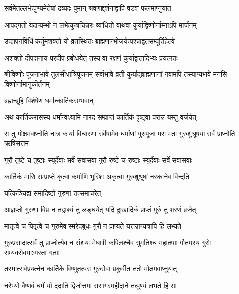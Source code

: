 \twolineshloka
{सर्वमेतल्लभेत्पुण्यमेतेषां द्रव्यदः पुमान्}
{श्रवणाद्दर्शनाद्वापि षडंशं फलमाप्नुयात्} %

\twolineshloka
{आपद्गतो यदाप्यम्भो न लभेत्कुत्रचिन्नरः}
{व्याधितो वाथवा कुर्याद्विष्णोर्नाम्नाऽपि मार्जनम्} %

\twolineshloka
{उद्यापनविधिं कर्तुमशक्तो यो व्रतस्थितः}
{ब्राह्मणान्भोजयेत्पश्चाद्व्रतसम्पूर्तिहेतवे} %

\twolineshloka
{अशक्तो दीपदानाय परदीपं प्रबोधयेत्}
{तस्य वा रक्षणं कुर्याद्वातादिभ्यः प्रयत्नतः} %

\threelineshloka
{श्रीविष्णोः पूजनाभावे तुलसीधात्रिपूजनम्}
{सर्वाभावे व्रती कुर्याद्ब्राह्मणानां गवामपि}
{तस्याप्यभावे मनसि विष्णोर्नामानुकीर्तनम्} %



\onelineshloka
{ब्रह्मन्ब्रूहि विशेषेण धर्मान्कार्तिकसम्भवान्} %





\twolineshloka
{अथ कार्तिकमासस्य धर्मान्वक्ष्यामि नारद}
{सम्प्राप्तं कार्तिकं दृष्ट्वा परान्नं यस्तु वर्जयेत्} %

\threelineshloka
{स तु मोक्षमवाप्नोति नात्र कार्या विचारणा}
{सर्वेषामेव धर्माणां गुरुपूजा परा मता}
{गुरुशुश्रूषया सर्वं प्राप्नोति ऋषिसत्तम} %

\twolineshloka
{गुरौ तुष्टे च तुष्टाः स्युर्देवाः सर्वे सवासवा}
{गुरौ रुष्टे च रुष्टाः स्युर्देवाः सर्वे सवासवाः} %


\twolineshloka
{कार्तिकं मासि सम्प्राप्ते कृत्वा कर्माणि भूरिशः}
{अकृत्वा गुरुशुश्रूषां नरकानेव विन्दति} %

\onelineshloka
{यत्किञ्चिद्वा समादिष्टो गुरुणा तत्समाचरेत्} %

\twolineshloka
{आज्ञप्तो गुरुणा विप्र न तद्वाक्यं तु लङ्घयेत्}
{यदि दुःखादिकं प्राप्तं गुरुं तु शरणं व्रजेत्} %

\twolineshloka
{मातृत्वे च पितृत्वे च गुरुमेव स्मरेद्बुधः}
{गुरौ न प्राप्यते यत्तन्नान्यत्रापि हि लभ्यते} %

\threelineshloka
{गुरुप्रसादात्सर्वं तु प्राप्नोत्येव न संशयः}
{मेधावी कपिलश्चैव सुमतिश्च महातपाः}
{गौतमस्य गुरोः सम्यक्सेवयाऽमरतां गताः} %

\twolineshloka
{तस्मात्सर्वप्रयत्नेन कार्तिके विष्णुतत्परः}
{गुरुसेवां प्रकुर्वीत ततो मोक्षमवाप्नुयात्} %

\twolineshloka
{नरेभ्यो वैष्णवं धर्मं यो ददाति द्विजोत्तमः}
{ससागरमहीदाने तत्पुण्यं लभते हि सः} %

